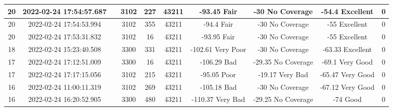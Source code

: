 \begin{longtable*}{|c|c|c|c|c|c|c|c|c|c|}
20&2022-02-24 17:54:57.687&&3102&227&43211& -93.45    Fair        & -30       No Coverage & -54.4     Excellent   & 0\\\hline
{}20&2022-02-24 17:54:53.994&&3102&355&43211& -94.4     Fair        & -30       No Coverage & -55       Excellent   & 0\\\hline
{}20&2022-02-24 17:53:31.832&&3102&16&43211& -93.95    Fair        & -30       No Coverage & -55       Excellent   & 0\\\hline
{}18&2022-02-24 15:23:40.508&&3300&331&43211& -102.61   Very Poor   & -30       No Coverage & -63.33    Excellent   & 0\\\hline
{}17&2022-02-24 17:12:51.009&&3300&16&43211& -106.29   Bad         & -29.35    No Coverage & -69.1     Very Good   & 0\\\hline
{}17&2022-02-24 17:17:15.056&&3102&215&43211& -95.05    Poor        & -19.17    Very Bad    & -65.47    Very Good   & 0\\\hline
{}16&2022-02-24 11:00:11.319&&3102&269&43211& -105.18   Bad         & -30       No Coverage & -67.12    Very Good   & 0\\\hline
{}16&2022-02-24 16:20:52.905&&3300&480&43211& -110.37   Very Bad    & -29.25    No Coverage & -74       Good        & 0\\\hline

\end{longtable*}
